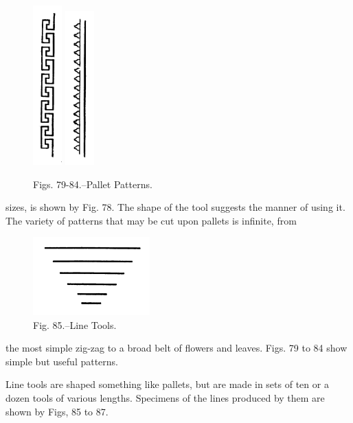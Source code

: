 \documentclass[twoside]{book}
\begin{document}
\begin{figure}[h]
		\includegraphics[width=0.1\textwidth]{Figures/_083.png}
		\includegraphics[width=0.1\textwidth]{Figures/_084.png}
		\caption*{Figs. 79-84.--Pallet Patterns.}
	\end{figure}
sizes, is shown by Fig. 78. The shape of the tool
suggests the manner of using it. The variety of
patterns that may be cut upon pallets is infinite, from
	\begin{figure}[h]
		\centering
		\includegraphics[width=0.4\textwidth]{Figures/_085.png}
		\caption*{Fig. 85.--Line Tools.}
	\end{figure}
the most simple zig-zag to a broad belt of flowers and
leaves. Figs. 79 to 84 show simple but useful
patterns.

Line tools are shaped something like pallets, but
\pagebreak
are made in sets of ten or a dozen tools of various
lengths. Specimens of the lines produced by them
are shown by Figs, 85 to 87.
\end{document}
